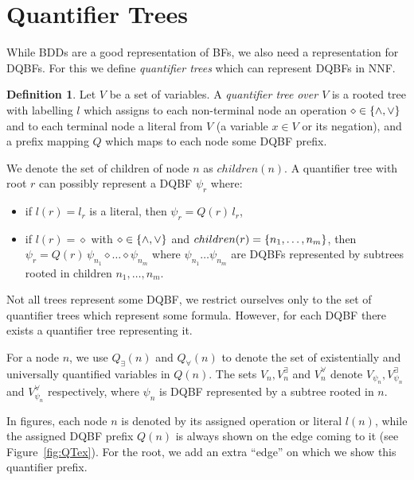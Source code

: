 \documentclass[
  digital, %
  color,
  twoside, %
  table,   %
  nolof,     %
  nolot,     %
]{fithesis3}
\let\setbuilder\set
\newcommand{\simpleset}[1]{\{{#1}\}}
\renewcommand{\set}[1]{\normalexpandarg\IfSubStr{#1}{|}{\setbuilder{#1}}{\simpleset{#1}}}
\theoremstyle{definition}
\newtheorem{definition}{Definition}
\theoremstyle{remark}
\newcommand{\vars}[1]{V_{#1}}
\newcommand{\evars}[1]{V_{#1}^{\exists}}
\newcommand{\uvars}[1]{V_{#1}^{\forall}}
\newcommand{\itholds}{\,}
\newcommand{\qtlabel}[1]{l({#1})}
\newcommand{\prefix}[1]{Q({#1})}
\newcommand{\eprefix}[1]{Q_{\exists}(#1)}
\newcommand{\uprefix}[1]{Q_{\forall}(#1)}
\newcommand{\children}[1]{children({#1})}
\begin{document}
\section{Quantifier Trees}
\label{sec:QT}
While BDDs are a good representation of BFs, we also need a representation for DQBFs. For this we define \emph{quantifier trees} which can represent DQBFs in NNF.

\begin{definition}
  Let $V$ be a set of variables. A \emph{quantifier tree} \emph{over $V$} is a rooted tree with labelling $l$ which assigns to each non-terminal node an operation ${\diamond} \in \set{{\land},{\lor}}$ and to each terminal node a literal from $V$ (a variable $x \in V$ or its negation), and a prefix mapping $Q$ which maps to each node some DQBF prefix.
\end{definition}

We denote the set of children of node $n$ as $\children{n}$.  A quantifier tree with root $r$ can possibly represent a DQBF $\psi_r$ where:
\begin{itemize}
    \item if $\qtlabel{r} = l_r$ is a literal, then $\psi_r = \prefix{r} \itholds l_r$,
    \item if $\qtlabel{r} = {\diamond}$ with ${\diamond} \in \set{{\land},{\lor}}$ and $\children{r} = \set{n_1,\dots, n_m}$, then $\psi_r = \prefix{r} \itholds \psi_{n_1} \diamond \dots \diamond \psi_{n_m}$ where $\psi_{n_1} \dots \psi_{n_m}$ are DQBFs represented by subtrees rooted in children $n_1,\dots,n_m$.
\end{itemize}
Not all trees represent some DQBF, we restrict ourselves only to the set of quantifier trees which represent some formula. However, for each DQBF there exists a quantifier tree representing it.

For a node $n$, we use $\eprefix{n}$ and $\uprefix{n}$ to denote the set of existentially and universally quantified variables in $\prefix{n}$. The sets $\vars{n}, \evars{n}$ and $\uvars{n}$ denote $\vars{\psi_n}, \evars{\psi_n}$ and $\uvars{\psi_n}$ respectively, where $\psi_n$ is DQBF represented by a subtree rooted in $n$.

In figures, each node $n$ is denoted by its assigned operation or literal $\qtlabel{n}$, while the assigned DQBF prefix $\prefix{n}$ is always shown on the edge coming to it (see Figure~\ref{fig:QTex}). For the root, we add an extra ``edge'' on which we show this quantifier prefix.
\end{document}

